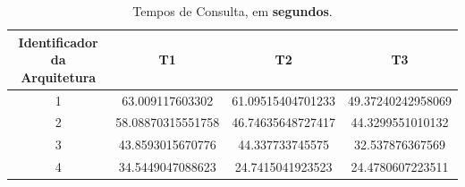 \documentclass{article}
\begin{document}
\begin{table}[H]
\centering
\begin{tabular}{|c|c|c|c|}
\hline
Identificador da Arquitetura & T1 & T2 & T3\\ \hline 
\hline
1 & 63.009117603302 & 61.09515404701233 & 49.37240242958069\\ \hline
2 & 58.08870315551758 & 46.74635648727417 & 44.3299551010132
\\ \hline
3 & 43.8593015670776
 & 44.337733745575
& 32.537876367569
\\ \hline
4 & 34.5449047088623
 & 24.7415041923523
& 24.4780607223511
\\ \hline
\end{tabular}
\caption{Tempos de Consulta, em \textbf{segundos}.}
\label{tab:query}
\end{table}
\end{document}
